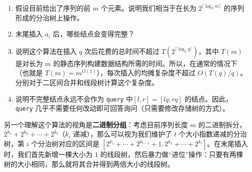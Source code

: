 \begin{exercise}[分治树的末尾插入]
\begin{center}
    \label{fig:prefix-of-divtree}
\end{center}

    \begin{enumerate}
        \item 假设目前给出了序列的前 $m$ 个元素。说明我们相当于在长为 $2^{\lceil\log_2 m\rceil}$ 的序列形成的分治树上操作。
        \item 末尾插入 $a_i$ 后，哪些结点会变得完整？
        \item 说明这个算法在插入 $q$ 次后花费的总时间不超过 $T(2^{\lceil \log_2 q\rceil})$，其中 $T(m)$ 是对长为 $m$ 的静态序列构建数据结构所需的时间。所以，在通常的情况下（也就是 $T(m)=m^{O(1)}$），每次插入的均摊复杂度不超过 $O(T(q)/q)$。分别对于二区间合并和线段树计算这个复杂度。
        \item 说明不完整结点永远不会作为 \texttt{query} 中$[l,r]=[lq,rq]$ 的结点。因此，\texttt{query} 几乎不需要任何改动即可回答询问（只需要修改存储树的方式）。
    \end{enumerate}
\end{exercise}
\begin{remark}
    另一个理解这个算法的视角是\textbf{二进制分组}：考虑目前序列长度 $m$ 的二进制拆分，$2^{k_1}+2^{k_2}+\cdots+2^{k_t}$（$k_i$ 递减），那么可以视为我们维护了 $t$ 个大小指数递减的分治树，第 $i$ 个分治树对应的区间是 $[2^{k_1}+\cdots+2^{k_{i-1}}+1,2^{k_1}+\cdots+2^{k_i}]$。在末尾插入时，我们首先新增一棵大小为 $1$ 的线段树，然后暴力做“进位”操作：只要有两棵树的大小相同，那么就将其合并得到两倍大小的线段树。
\end{remark}



